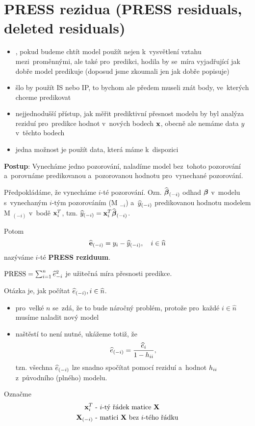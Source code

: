 \section{PRESS rezidua (PRESS residuals, deleted residuals)}
\begin{itemize}
	\item, pokud budeme chtít model použít nejen k~vysvětlení vztahu mezi~proměnnými, ale také pro~predikci, hodila by se~míra vyjadřující jak dobře model predikuje (doposud jsme zkoumali jen jak dobře popisuje)
	\item šlo by použít IS nebo IP, to bychom ale předem museli znát body, ve~kterých chceme predikovat
	\item nejjednodušší přístup, jak měřit prediktivní přesnost modelu by byl analýza reziduí pro~predikce hodnot v~nových bodech $\textbf{x}$, obecně ale nemáme data $y$ v~těchto bodech
	\item jedna možnost je použít data, která máme k~dispozici
\end{itemize}

\textbf{Postup}: Vynecháme jedno pozorování, naladíme model bez~tohoto pozorování a~porovnáme predikovanou a~pozorovanou hodnotu pro~vynechané pozorování.

Předpokládáme, že vynecháme $i$-té pozorování. Ozn. $\widehat{\boldsymbol{\beta}}_{(-i)}$ odhad $\boldsymbol{\beta}$ v~modelu s~vynechaným $i$-tým pozorováním (M $_{-i}$) a~$\widehat{y}_{(-i)}$ predikovanou hodnotu modelem M $_{(-i)}$ v~bodě $\textbf{x}_i^T$, tzn. $\widehat{y}_{(-i)} = \textbf{x}_i^T \widehat{\boldsymbol{\beta}}_{(-i)}$.

Potom
 $$
\widehat{\textbf{e}}_{(-i)} = y_i - \widehat{y}_{(-i)}, \quad i\in\widehat{n}
 $$
nazýváme $i$-té \textbf{PRESS reziduum}.

 $\mathrm{PRESS} = \sum_{i = 1}^n \widehat{e}_{-i}^2$ je užitečná míra přesnosti predikce.

\begin{remark}
	Otázka je, jak počítat $\widehat{e}_{(-i)}, i\in\widehat{n} $.
	\begin{itemize}
		\item pro~velké $n$ se~zdá, že to bude náročný problém, protože pro~každé $i \in \widehat{n}$ musíme naladit nový model
		\item naštěstí to není nutné, ukážeme totiž, že
		 $$
		\widehat{e}_{(-i)} = \frac{\widehat{e}_i}{1 - h_{ii}},
		 $$
		tzn. všechna $\widehat{e}_{(-i)}$ lze snadno spočítat pomocí reziduí a~hodnot $h_{ii}$ z~původního (plného) modelu.
	\end{itemize}
\end{remark}

Označme
\begin{align*}
	\textbf{x}_i^T & \text{ - $i$-tý řádek matice } \textbf{X} \\
	\textbf{X}_{(-i)} & \text{ - matici $\textbf{X}$ bez~$i$-tého řádku}
\end{align*}

